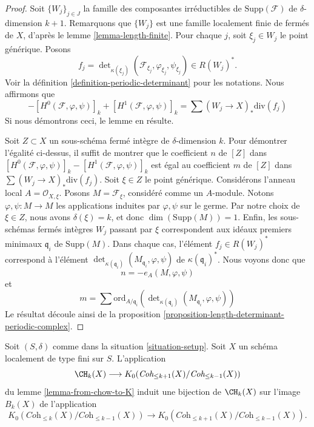 \begin{proof}
Soit $\{W_j\}_{j \in J}$ la famille des composantes irréductibles
de $\text{Supp}(\mathcal{F})$
de $\delta$-dimension $k + 1$. Remarquons que $\{W_j\}$
est une famille localement finie de fermés de
$X$, d'après le lemme \ref{lemma-length-finite}.
Pour chaque $j$, soit $\xi_j \in W_j$ le point générique.
Posons
$$
f_j = \det\nolimits_{\kappa(\xi_j)}
(\mathcal{F}_{\xi_j}, \varphi_{\xi_j}, \psi_{\xi_j})
\in
R(W_j)^*.
$$
Voir la définition \ref{definition-periodic-determinant} pour les notations.
Nous affirmons que
$$
- [H^0(\mathcal{F}, \varphi, \psi)]_k + [H^1(\mathcal{F}, \varphi, \psi)]_k
=
\sum (W_j \to X)_*\text{div}(f_j)
$$
Si nous démontrons ceci, le lemme en résulte.

\medskip\noindent
Soit $Z \subset X$ un sous-schéma fermé intègre de $\delta$-dimension $k$.
Pour démontrer l'égalité ci-dessus, il suffit de montrer que le coefficient $n$
de $[Z]$ dans
$
[H^0(\mathcal{F}, \varphi, \psi)]_k - [H^1(\mathcal{F}, \varphi, \psi)]_k
$
est égal au coefficient $m$ de $[Z]$ dans
$
\sum (W_j \to X)_*\text{div}(f_j)
$.
Soit $\xi \in Z$ le point générique.
Considérons l'anneau local $A = \mathcal{O}_{X, \xi}$.
Posons $M = \mathcal{F}_\xi$, considéré comme un $A$-module.
Notons $\varphi, \psi : M \to M$ les applications induites par $\varphi, \psi$ sur
le germe.
Par notre choix de $\xi \in Z$, nous avons $\delta(\xi) = k$,
et donc $\dim(\text{Supp}(M)) = 1$.
Enfin, les sous-schémas fermés intègres
$W_j$ passant par $\xi$ correspondent aux idéaux premiers minimaux
$\mathfrak q_i$ de $\text{Supp}(M)$.
Dans chaque cas, l'élément $f_j \in R(W_j)^*$ correspond à
l'élément $\det_{\kappa(\mathfrak q_i)}(M_{\mathfrak q_i}, \varphi, \psi)$
de $\kappa(\mathfrak q_i)^*$. Nous voyons donc que
$$
n = - e_A(M, \varphi, \psi)
$$
et
$$
m =
\sum
\text{ord}_{A/\mathfrak q_i}
(\det\nolimits_{\kappa(\mathfrak q_i)}(M_{\mathfrak q_i}, \varphi, \psi))
$$
Le résultat découle ainsi de la
proposition \ref{proposition-length-determinant-periodic-complex}.
\end{proof}

\begin{lemma}
\label{lemma-cycles-rational-equivalence-K-group}
Soit $(S, \delta)$ comme dans la situation \ref{situation-setup}.
Soit $X$ un schéma localement de type fini sur $S$.
L'application
$$
\CH_k(X) \longrightarrow
K_0(\textit{Coh}_{\leq k + 1}(X)/\textit{Coh}_{\leq k - 1}(X))
$$
du lemme \ref{lemma-from-chow-to-K} induit une bijection de
$\CH_k(X)$ sur l'image $B_k(X)$ de l'application
$$
K_0(\textit{Coh}_{\leq k}(X)/\textit{Coh}_{\leq k - 1}(X))
\longrightarrow
K_0(\textit{Coh}_{\leq k + 1}(X)/\textit{Coh}_{\leq k - 1}(X)).
$$
\end{lemma}


